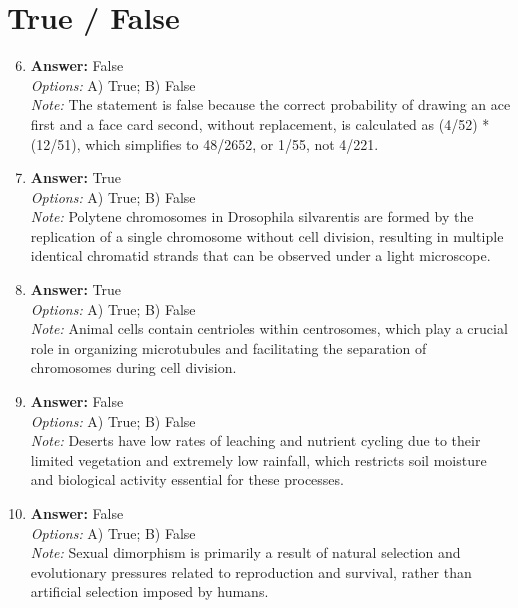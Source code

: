 \documentclass[12pt]{article}
\begin{document}
\section*{True / False}
\begin{enumerate}[label=\arabic*.]
\setcounter{enumi}{5}
\item \textbf{Answer:} False
\\ \textit{Options:} A) True; B) False
\\ \textit{Note:} The statement is false because the correct probability of drawing an ace first and a face card second, without replacement, is calculated as (4/52) * (12/51), which simplifies to 48/2652, or 1/55, not 4/221.
\item \textbf{Answer:} True
\\ \textit{Options:} A) True; B) False
\\ \textit{Note:} Polytene chromosomes in Drosophila silvarentis are formed by the replication of a single chromosome without cell division, resulting in multiple identical chromatid strands that can be observed under a light microscope.
\item \textbf{Answer:} True
\\ \textit{Options:} A) True; B) False
\\ \textit{Note:} Animal cells contain centrioles within centrosomes, which play a crucial role in organizing microtubules and facilitating the separation of chromosomes during cell division.
\item \textbf{Answer:} False
\\ \textit{Options:} A) True; B) False
\\ \textit{Note:} Deserts have low rates of leaching and nutrient cycling due to their limited vegetation and extremely low rainfall, which restricts soil moisture and biological activity essential for these processes.
\item \textbf{Answer:} False
\\ \textit{Options:} A) True; B) False
\\ \textit{Note:} Sexual dimorphism is primarily a result of natural selection and evolutionary pressures related to reproduction and survival, rather than artificial selection imposed by humans.
\end{enumerate}
\end{document}

